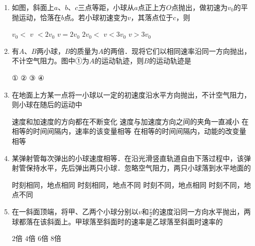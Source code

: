 \begin{enumerate}[leftmargin=0em]
{\begin{enumerate}
\end{enumerate}


}



\item 
{}
如图，斜面上$ a $、$ b $、$ c $三点等距，小球从$ a $点正上方$ O $点抛出，做初速为$ v_{0} $的平抛运动，恰落在$ b $点。若小球初速变为$ v $，其落点位于$ c $，则  
\begin{figure}[h!]
\centering

\end{figure}


\fourchoices
{$ v_{0} < $ $ v $ $ <2 v_{0} $}
{$ v=2 v_{0} $}
{$ 2 v_{0} < $ $ v <3 v_{0} $ }
{$ v>3 v_{0} $}



\item 
{}
有$ A $、$ B $两小球，$ B $的质量为$ A $的两倍．现将它们以相同速率沿同一方向抛出，不计空气阻力。图中①为$ A $的运动轨迹，则$ B $的运动轨迹是  
\begin{figure}[h!]
\centering

\end{figure}

\fourchoices
{①}
{②}
{③}
{④}


\item 
{}
在地面上方某一点将一小球以一定的初速度沿水平方向抛出，不计空气阻力，则小球在随后的运动中  

\fourchoices
{速度和加速度的方向都在不断变化}
{速度与加速度方向之间的夹角一直减小}
{在相等的时间间隔内，速率的该变量相等}
{在相等的时间间隔内，动能的改变量相等}



\item 
{}
某弹射管每次弹出的小球速度相等．在沿光滑竖直轨道自由下落过程中，该弹射管保持水平，先后弹出两只小球．忽略空气阻力，两只小球落到水平地面的  

\fourchoices
{时刻相同，地点相同}
{时刻相同，地点不同}
{时刻不同，地点相同}
{时刻不同，地点不同}


\item 
{}
在一斜面顶端，将甲、乙两个小球分别以$ v $和$ \frac{v}{2} $的速度沿同一方向水平抛出，两球都落在该斜面上。甲球落至斜面时的速率是乙球落至斜面时速率的  

\fourchoices
{$ 2 $倍}
{$ 4 $倍	}
{$ 6 $倍}
{$ 8 $倍}



\end{enumerate}
